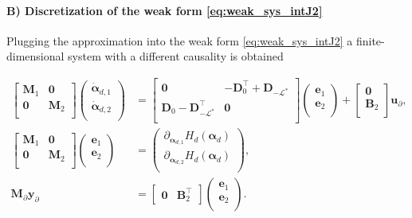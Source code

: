 \paragraph{B) Discretization of the weak form \eqref{eq:weak_sys_intJ2}}
Plugging the approximation into the weak form \eqref{eq:weak_sys_intJ2} a finite-dimensional system with a different causality is obtained

\begin{equation}\label{eq:pHsys_findim_J2}
\begin{aligned}
\begin{bmatrix}
\mathbf{M}_1 & \mathbf{0} \\
\mathbf{0} & \mathbf{M}_2 \\
\end{bmatrix}
\begin{pmatrix}
\dot{\bm{\alpha}}_{d, 1} \\
\dot{\bm{\alpha}}_{d, 2} \\
\end{pmatrix}
&= \begin{bmatrix}
\mathbf{0} & -\mathbf{D}_{0}^\top + \mathbf{D}_{-\mathcal{L}^*} \\
\mathbf{D}_{0} - \mathbf{D}_{-\mathcal{L}^*}^\top & \mathbf{0} \\
\end{bmatrix} 
\begin{pmatrix}
\mathbf{e}_{1} \\
\mathbf{e}_{2} \\
\end{pmatrix} + 
\begin{bmatrix}
\mathbf{0}\\
\mathbf{B}_2\\
\end{bmatrix}
\mathbf{u}_\partial, \\
\begin{bmatrix}
\mathbf{M}_1 & \mathbf{0} \\
\mathbf{0} & \mathbf{M}_2 \\
\end{bmatrix}
\begin{pmatrix}
\mathbf{e}_{1} \\
\mathbf{e}_{2} \\
\end{pmatrix}
&= \begin{pmatrix}
\partial_{\bm{\alpha}_{d, 1}} H_d(\bm{\alpha}_d)\\
\partial_{\bm{\alpha}_{d, 2}} H_d(\bm{\alpha}_d)\\
\end{pmatrix}, \\
\mathbf{M}_\partial {\mathbf{y}_\partial} &= 
\begin{bmatrix}
\mathbf{0} & \mathbf{B}_2^\top 
\end{bmatrix}\begin{pmatrix}
\mathbf{e}_{1} \\
\mathbf{e}_{2} \\
\end{pmatrix}.
\end{aligned}
\end{equation}
